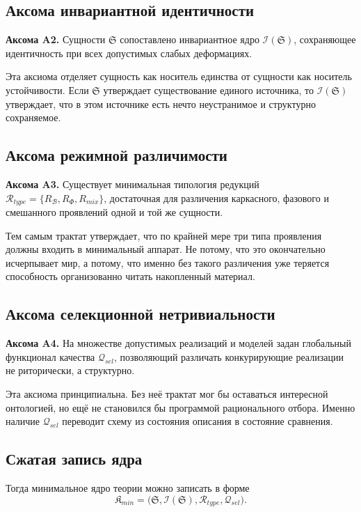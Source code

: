 \documentclass[12pt,a4paper]{article}
\begin{document}
\subsection{Аксома инвариантной идентичности}

\textbf{Аксома A2.} Сущности \(\mathfrak{S}\) сопоставлено инвариантное ядро \(\mathcal{I}(\mathfrak{S})\), сохраняющее идентичность при всех допустимых слабых деформациях.

Эта аксиома отделяет сущность как носитель единства от сущности как носитель устойчивости. Если \(\mathfrak{S}\) утверждает существование единого источника, то \(\mathcal{I}(\mathfrak{S})\) утверждает, что в этом источнике есть нечто неустранимое и структурно сохраняемое.

\subsection{Аксома режимной различимости}

\textbf{Аксома A3.} Существует минимальная типология редукций \(\mathcal{R}_{type}=\{R_{\mathcal{B}},R_{\Phi},R_{mix}\}\), достаточная для различения каркасного, фазового и смешанного проявлений одной и той же сущности.

Тем самым трактат утверждает, что по крайней мере три типа проявления должны входить в минимальный аппарат. Не потому, что это окончательно исчерпывает мир, а потому, что именно без такого различения уже теряется способность организованно читать накопленный материал.

\subsection{Аксома селекционной нетривиальности}

\textbf{Аксома A4.} На множестве допустимых реализаций и моделей задан глобальный функционал качества \(\mathcal{Q}_{sel}\), позволяющий различать конкурирующие реализации не риторически, а структурно.

Эта аксиома принципиальна. Без неё трактат мог бы оставаться интересной онтологией, но ещё не становился бы программой рационального отбора. Именно наличие \(\mathcal{Q}_{sel}\) переводит схему из состояния описания в состояние сравнения.

\subsection{Сжатая запись ядра}

Тогда минимальное ядро теории можно записать в форме
\begin{equation}
\mathfrak{K}_{min}=\bigl(\mathfrak{S},\mathcal{I}(\mathfrak{S}),\mathcal{R}_{type},\mathcal{Q}_{sel}\bigr).
\end{equation}
\end{document}
